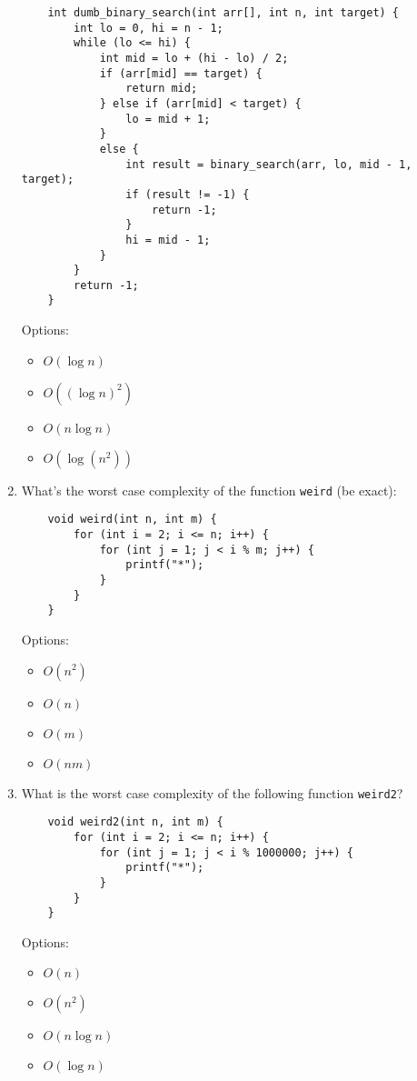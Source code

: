 \documentclass{article}
\begin{document}
\begin{enumerate}
\begin{lstlisting}
    int dumb_binary_search(int arr[], int n, int target) {
        int lo = 0, hi = n - 1;
        while (lo <= hi) {
            int mid = lo + (hi - lo) / 2;
            if (arr[mid] == target) {
                return mid;
            } else if (arr[mid] < target) {
                lo = mid + 1;
            }
            else {
                int result = binary_search(arr, lo, mid - 1, target);
                if (result != -1) {
                    return -1;
                }
                hi = mid - 1;
            }
        }
        return -1;
    }
    \end{lstlisting}
    Options:
    \begin{itemize}
        \item \( O(\log n) \)
        \item \( O((\log n)^2) \) \hl{\checkmark}
        \item \( O(n \log n) \)
        \item \( O(\log (n^2)) \)
    \end{itemize}

    \newpage
    
    \item What’s the worst case complexity of the function \texttt{weird} (be exact):
    \begin{lstlisting}
    void weird(int n, int m) {
        for (int i = 2; i <= n; i++) {
            for (int j = 1; j < i % m; j++) {
                printf("*");
            }
        }
    }
    \end{lstlisting}
    Options:
    \begin{itemize}
        \item \( O(n^2) \)
        \item \( O(n) \)
        \item \( O(m) \)
        \item \( O(nm) \) \hl{\checkmark}
    \end{itemize}

    \item What is the worst case complexity of the following function \texttt{weird2}?
    \begin{lstlisting}
    void weird2(int n, int m) {
        for (int i = 2; i <= n; i++) {
            for (int j = 1; j < i % 1000000; j++) {
                printf("*");
            }
        }
    }
    \end{lstlisting}
    Options:
    \begin{itemize}
        \item \( O(n) \) \hl{\checkmark}
        \item \( O(n^2) \)
        \item \( O(n \log n) \)
        \item \( O(\log n) \)
    \end{itemize}



\end{enumerate}
\end{document}

